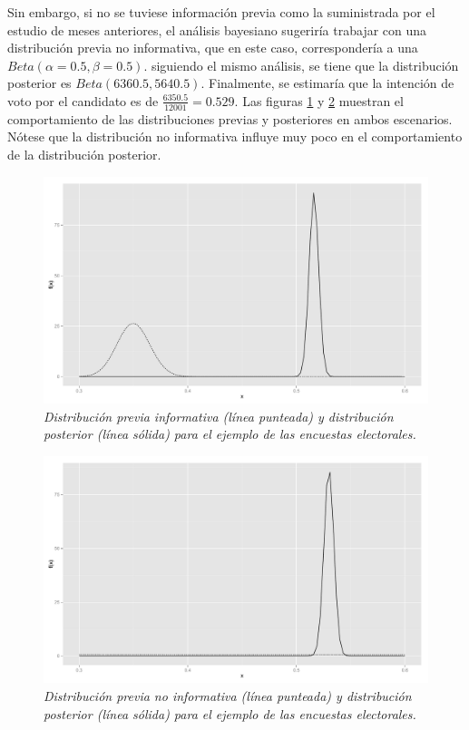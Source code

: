 \documentclass[10pt,openright]{book}\usepackage[]{graphicx}\usepackage[]{color}
\begin{document}
\begin{Eje}
    Sin embargo, si no se tuviese informaci\'on previa como la suministrada por el estudio de meses anteriores, el an\'alisis bayesiano sugerir\'ia trabajar con una distribuci\'on previa no informativa, que en este caso, corresponder\'ia a una $Beta(\alpha=0.5, \beta=0.5)$. siguiendo el mismo an\'alisis, se tiene que la distribuci\'on posterior es $Beta(6360.5, 5640.5)$. Finalmente, se estimar\'ia que la intenci\'on de voto por el candidato es de $\frac{6350.5}{12001}=0.529$. Las figuras \ref{BernoEj1} y \ref{BernoEj2} muestran el comportamiento de las distribuciones previas y posteriores en ambos escenarios. N\'otese que la distribuci\'on no informativa influye muy poco en el comportamiento de la distribuci\'on posterior.
    
    \begin{figure}[!h]
    \centering
    \includegraphics[scale=0.28]{BernoEj1.pdf}
    \caption{\emph{Distribuci\'on previa informativa (l\'inea punteada) y distribuci\'on posterior (l\'inea s\'olida) para el ejemplo de las encuestas electorales.}}
    \label{BernoEj1}
    \end{figure}
    
    \begin{figure}[!h]
    \centering
    \includegraphics[scale=0.28]{BernoEj2.pdf}
    \caption{\emph{Distribuci\'on previa no informativa (l\'inea punteada) y distribuci\'on posterior (l\'inea s\'olida) para el ejemplo de las encuestas electorales.}}
    \label{BernoEj2}
    \end{figure}
    

\end{Eje}
\end{document}
